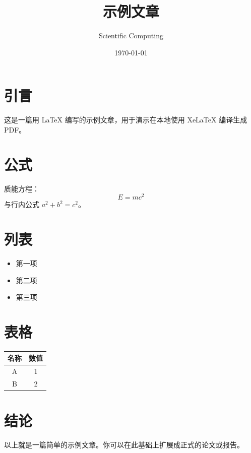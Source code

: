 \documentclass[12pt]{ctexart}
\title{示例文章}
\author{Scientific Computing}
\date{\today}
\begin{document}
\maketitle

\section{引言}
这是一篇用 \LaTeX{} 编写的示例文章，用于演示在本地使用 XeLaTeX 编译生成 PDF。

\section{公式}
质能方程：
\[
E = mc^2
\]
与行内公式 \( a^2 + b^2 = c^2 \)。

\section{列表}
\begin{itemize}
  \item 第一项
  \item 第二项
  \item 第三项
\end{itemize}

\section{表格}
\begin{center}
\begin{tabular}{|c|c|}
\hline
名称 & 数值 \\
\hline
A & 1 \\
B & 2 \\
\hline
\end{tabular}
\end{center}

\section{结论}
以上就是一篇简单的示例文章。你可以在此基础上扩展成正式的论文或报告。
\end{document}

